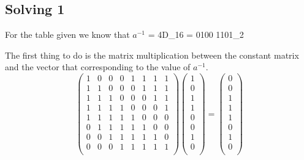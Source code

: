 \documentclass[12pt]{article}
\begin{document}
       \subsection{Solving 1}
           For the table given we know that {$a^{-1}$} = {4D_{16}} = {0100 1101_2}
           
           The first thing to do is the matrix multiplication between the constant matrix and the vector that corresponding to the value of {$a^{-1}$}. 
           \[
                \left(
                    \begin{array}{rrrrrrrr}
                    1 & 0 & 0 & 0 & 1 & 1 & 1 & 1 \\
                    1 & 1 & 0 & 0 & 0 & 1 & 1 & 1 \\
                    1 & 1 & 1 & 0 & 0 & 0 & 1 & 1 \\
                    1 & 1 & 1 & 1 & 0 & 0 & 0 & 1 \\
                    1 & 1 & 1 & 1 & 1 & 0 & 0 & 0 \\
                    0 & 1 & 1 & 1 & 1 & 1 & 0 & 0 \\
                    0 & 0 & 1 & 1 & 1 & 1 & 1 & 0 \\
                    0 & 0 & 0 & 1 & 1 & 1 & 1 & 1 \\
                    \end{array}
                \right)
                \left(
                    \begin{array}{l}
                    1 \\
                    0 \\
                    1 \\
                    1 \\
                    0 \\
                    0 \\
                    1 \\
                    0 \\
                    \end{array}
                \right)
                =
                \left(
                    \begin{array}{l}
                    0 \\
                    0 \\
                    1 \\
                    1 \\
                    1 \\
                    0 \\
                    1 \\
                    0 \\
                    \end{array}
                \right)
            \]
\end{document}
